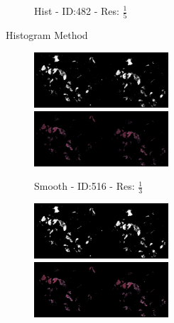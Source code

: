 \documentclass[letterpaper,10pt,oneside]{article}
\begin{document}
\begin{figure}[hbtp]
\begin{subfigure}[b]{5cm}
    \caption{Hist - ID:482 - Res: $\frac{1}{5}$}
  \end{subfigure}
  \caption{Histogram Method}
  \label{fig:histseg}
\end{figure}

\begin{figure}[hbtp]
  \centering
  \begin{subfigure}[b]{5cm}
    \includegraphics[width=5cm]{visualization/results/smoothhistogram/res_reduce_3/Region_0_PO13-00516A1_1_7_201305171148.png}
    \includegraphics[width=5cm]{visualization/results/smoothhistogram/res_reduce_3/Region_1_PO13-00516A1_1_7_201305171148.png}
    \caption{Smooth - ID:516 - Res: $\frac{1}{3}$}
  \end{subfigure}
  \begin{subfigure}[b]{5cm}
    \includegraphics[width=5cm]{visualization/results/smoothhistogram/res_reduce_4/Region_0_PO13-00516A1_1_7_201305171148.png}
    \includegraphics[width=5cm]{visualization/results/smoothhistogram/res_reduce_4/Region_1_PO13-00516A1_1_7_201305171148.png}

\end{subfigure}
\end{figure}
\end{document}
